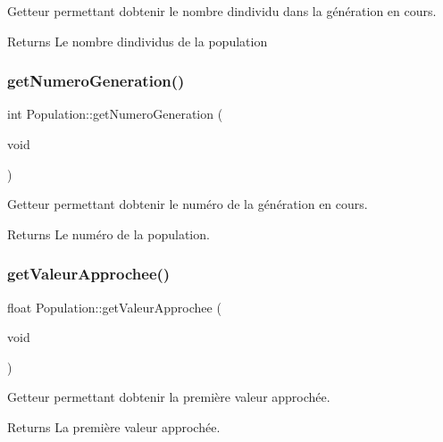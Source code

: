 Getteur permettant d\textquotesingle{}obtenir le nombre d\textquotesingle{}individu dans la génération en cours. 

\begin{DoxyReturn}{Returns}
Le nombre d\textquotesingle{}individus de la population 
\end{DoxyReturn}
\mbox{\label{class_population_ab43617fa07bb45f18b426f3677243799}} 
\subsubsection{\texorpdfstring{get\+Numero\+Generation()}{getNumeroGeneration()}}
{\footnotesize\ttfamily int Population\+::get\+Numero\+Generation (\begin{DoxyParamCaption}\item[{void}]{ }\end{DoxyParamCaption})}



Getteur permettant d\textquotesingle{}obtenir le numéro de la génération en cours. 

\begin{DoxyReturn}{Returns}
Le numéro de la population. 
\end{DoxyReturn}
\mbox{\label{class_population_a835c9a996c627d5e7672f880ef390499}} 
\subsubsection{\texorpdfstring{get\+Valeur\+Approchee()}{getValeurApprochee()}}
{\footnotesize\ttfamily float Population\+::get\+Valeur\+Approchee (\begin{DoxyParamCaption}\item[{void}]{ }\end{DoxyParamCaption})}



Getteur permettant d\textquotesingle{}obtenir la première valeur approchée. 

\begin{DoxyReturn}{Returns}
La première valeur approchée. 
\end{DoxyReturn}
\mbox{\label{class_population_a00d211e7d650c681f78dcde25751afa2}} 
